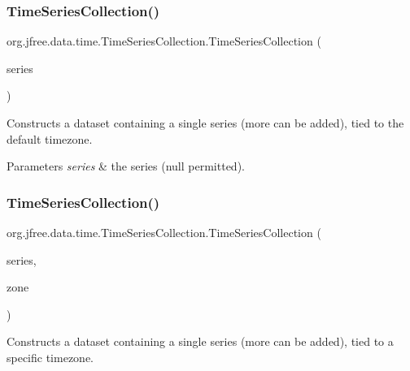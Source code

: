\subsubsection{\texorpdfstring{Time\+Series\+Collection()}{TimeSeriesCollection()}\hspace{0.1cm}{\footnotesize\ttfamily [3/4]}}
{\footnotesize\ttfamily org.\+jfree.\+data.\+time.\+Time\+Series\+Collection.\+Time\+Series\+Collection (\begin{DoxyParamCaption}\item[{\mbox{\hyperlink{classorg_1_1jfree_1_1data_1_1time_1_1_time_series}{Time\+Series}}}]{series }\end{DoxyParamCaption})}

Constructs a dataset containing a single series (more can be added), tied to the default timezone.


\begin{DoxyParams}{Parameters}
{\em series} & the series ({\ttfamily null} permitted). \\
\hline
\end{DoxyParams}
\mbox{\label{classorg_1_1jfree_1_1data_1_1time_1_1_time_series_collection_a303aaca786004a635b2c70f1d3fe012c}} 
\subsubsection{\texorpdfstring{Time\+Series\+Collection()}{TimeSeriesCollection()}\hspace{0.1cm}{\footnotesize\ttfamily [4/4]}}
{\footnotesize\ttfamily org.\+jfree.\+data.\+time.\+Time\+Series\+Collection.\+Time\+Series\+Collection (\begin{DoxyParamCaption}\item[{\mbox{\hyperlink{classorg_1_1jfree_1_1data_1_1time_1_1_time_series}{Time\+Series}}}]{series,  }\item[{Time\+Zone}]{zone }\end{DoxyParamCaption})}

Constructs a dataset containing a single series (more can be added), tied to a specific timezone.



